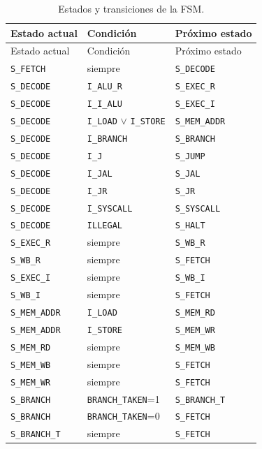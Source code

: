 \documentclass[11pt,a4paper]{article}
\begin{document}
\begin{longtable}{@{}p{2.7cm}p{4.2cm}p{8.5cm}@{}}
\caption{Estados y transiciones de la FSM.}
\label{tab:fsm}\\
\toprule
Estado actual & Condición & Próximo estado \\
\midrule
\endfirsthead
\toprule
Estado actual & Condición & Próximo estado \\
\midrule
\endhead
\texttt{S\_FETCH} & siempre & \texttt{S\_DECODE} \\
\texttt{S\_DECODE} & \texttt{I\_ALU\_R} & \texttt{S\_EXEC\_R} \\
\texttt{S\_DECODE} & \texttt{I\_I\_ALU} & \texttt{S\_EXEC\_I} \\
\texttt{S\_DECODE} & \texttt{I\_LOAD} $\lor$ \texttt{I\_STORE} & \texttt{S\_MEM\_ADDR} \\
\texttt{S\_DECODE} & \texttt{I\_BRANCH} & \texttt{S\_BRANCH} \\
\texttt{S\_DECODE} & \texttt{I\_J} & \texttt{S\_JUMP} \\
\texttt{S\_DECODE} & \texttt{I\_JAL} & \texttt{S\_JAL} \\
\texttt{S\_DECODE} & \texttt{I\_JR} & \texttt{S\_JR} \\
\texttt{S\_DECODE} & \texttt{I\_SYSCALL} & \texttt{S\_SYSCALL} \\
\texttt{S\_DECODE} & \texttt{ILLEGAL} & \texttt{S\_HALT} \\
\texttt{S\_EXEC\_R} & siempre & \texttt{S\_WB\_R} \\
\texttt{S\_WB\_R} & siempre & \texttt{S\_FETCH} \\
\texttt{S\_EXEC\_I} & siempre & \texttt{S\_WB\_I} \\
\texttt{S\_WB\_I} & siempre & \texttt{S\_FETCH} \\
\texttt{S\_MEM\_ADDR} & \texttt{I\_LOAD} & \texttt{S\_MEM\_RD} \\
\texttt{S\_MEM\_ADDR} & \texttt{I\_STORE} & \texttt{S\_MEM\_WR} \\
\texttt{S\_MEM\_RD} & siempre & \texttt{S\_MEM\_WB} \\
\texttt{S\_MEM\_WB} & siempre & \texttt{S\_FETCH} \\
\texttt{S\_MEM\_WR} & siempre & \texttt{S\_FETCH} \\
\texttt{S\_BRANCH} & \texttt{BRANCH\_TAKEN}=1 & \texttt{S\_BRANCH\_T} \\
\texttt{S\_BRANCH} & \texttt{BRANCH\_TAKEN}=0 & \texttt{S\_FETCH} \\
\texttt{S\_BRANCH\_T} & siempre & \texttt{S\_FETCH} \\

\end{longtable}
\end{document}
